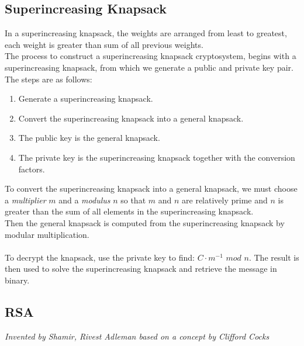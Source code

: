 \documentclass[a4paper]{article}
\begin{document}
\subsection{Superincreasing Knapsack}
In a superincreasing knapsack, the weights are arranged from least to greatest, each weight is greater than sum of all previous weights.\\
The process to construct a superincreasing knapsack cryptosystem, begins with a superincreasing knapsack, from which we generate a public and private key pair. The steps are as follows:

\begin{enumerate}
    \item Generate a superincreasing knapsack.
    \item Convert the superincreasing knapsack into a general knapsack.
    \item The public key is the general knapsack.
    \item The private key is the superincreasing knapsack together with the conversion factors.
\end{enumerate}

To convert the superincreasing knapsack into a general knapsack, we must choose a \textit{multiplier} $m$ and a \textit{modulus} $n$ so that $m$ and $n$ are relatively prime and $n$ is greater than the sum of all elements in the superincreasing knapsack.\\
Then the general knapsack is computed from the superincreasing knapsack by modular multiplication.\\\\
To decrypt the knapsack, use the private key to find: $C \cdot m^{-1}$ $mod$ $n$. The result is then used to solve the superincreasing knapsack and retrieve the message in binary.

\subsection{RSA}
\begin{center}
    \textit{Invented by Shamir, Rivest Adleman based on a concept by Clifford Cocks}
\end{center}
\end{document}
